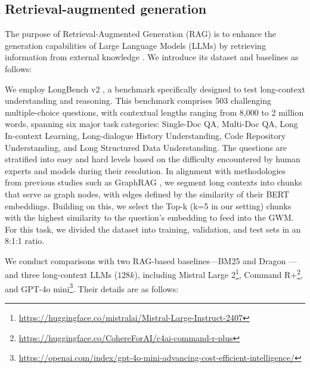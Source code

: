 \subsection{Retrieval-augmented generation} \label{apd:RAG}

The purpose of Retrieval-Augmented Generation (RAG) is to enhance the generation capabilities of Large Language Models (LLMs) by retrieving information from external knowledge \citep{lewis2020retrieval,gao2023retrieval,zhao2024retrieval}. We introduce its dataset and baselines as follows:


 We employ LongBench v2 \citep{bai2024longbench}, a benchmark specifically designed to test long-context understanding and reasoning. This benchmark comprises 503 challenging multiple-choice questions, with contextual lengths ranging from 8,000 to 2 million words, spanning six major task categories: Single-Doc QA, Multi-Doc QA, Long In-context Learning, Long-dialogue History Understanding, Code Repository Understanding, and Long Structured Data Understanding. The questions are stratified into easy and hard levels based on the difficulty encountered by human experts and models during their resolution. In alignment with methodologies from previous studies such as GraphRAG \citep{edge2024local}, we segment long contexts into chunks that serve as graph nodes, with edges defined by the similarity of their BERT embeddings. Building on this, we select the Top-k (k=5 in our setting) chunks with the highest similarity to the question's embedding to feed into the GWM. For this task, we divided the dataset into training, validation, and test sets in an 8:1:1 ratio.

 We conduct comparisons with two RAG-based baselines—BM25 \citep{robertson2009probabilistic} and Dragon \citep{lin2023train}—and three long-context LLMs ($128k$), including Mistral Large 2\footnote{\href{https://huggingface.co/mistralai/Mistral-Large-Instruct-2407}{https://huggingface.co/mistralai/Mistral-Large-Instruct-2407}}, Command R+\footnote{\href{https://huggingface.co/CohereForAI/c4ai-command-r-plus}{https://huggingface.co/CohereForAI/c4ai-command-r-plus}}, and GPT-4o mini\footnote{\href{https://openai.com/index/gpt-4o-mini-advancing-cost-efficient-intelligence/}{https://openai.com/index/gpt-4o-mini-advancing-cost-efficient-intelligence/}}. Their details are as follows:

